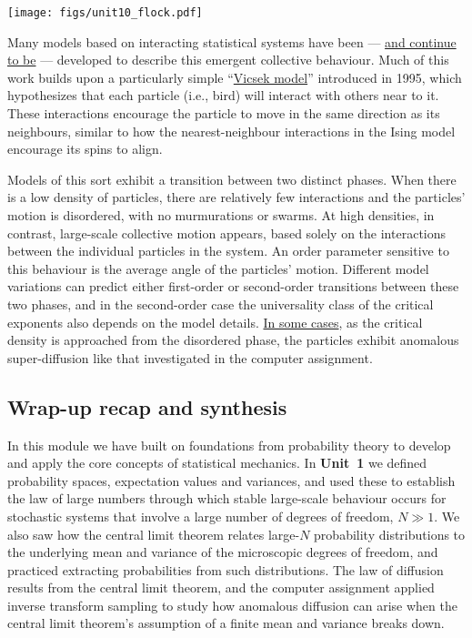 \begin{center}\texttt{[image: figs/unit10\_flock.pdf]}\end{center}

Many models based on interacting statistical systems have been --- \href{https://doi.org/10.1038/s41467-022-29883-4}{and continue to be} --- developed to describe this emergent collective behaviour.
Much of this work builds upon a particularly simple ``\href{https://en.wikipedia.org/wiki/Vicsek_model}{Vicsek model}'' introduced in 1995, which hypothesizes that each particle (i.e., bird) will interact with others near to it.
These interactions encourage the particle to move in the same direction as its neighbours, similar to how the nearest-neighbour interactions in the Ising model encourage its spins to align.

Models of this sort exhibit a transition between two distinct phases.
When there is a low density of particles, there are relatively few interactions and the particles' motion is disordered, with no murmurations or swarms.
At high densities, in contrast, large-scale collective motion appears, based solely on the interactions between the individual particles in the system.
An order parameter sensitive to this behaviour is the average angle of the particles' motion.
Different model variations can predict either first-order or second-order transitions between these two phases, and in the second-order case the universality class of the critical exponents also depends on the model details. %
\href{https://arxiv.org/abs/cond-mat/0401208}{In some cases}, as the critical density is approached from the disordered phase, the particles exhibit anomalous super-diffusion like that investigated in the computer assignment.



\subsection{Wrap-up recap and synthesis}
In this module we have built on foundations from probability theory to develop and apply the core concepts of statistical mechanics.
In \textbf{Unit~1} we defined probability spaces, expectation values and variances, and used these to establish the law of large numbers through which stable large-scale behaviour occurs for stochastic systems that involve a large number of degrees of freedom, $N \gg 1$.
We also saw how the central limit theorem relates large-$N$ probability distributions to the underlying mean and variance of the microscopic degrees of freedom, and practiced extracting probabilities from such distributions.
The law of diffusion results from the central limit theorem, and the computer assignment applied inverse transform sampling to study how anomalous diffusion can arise when the central limit theorem's assumption of a finite mean and variance breaks down.

